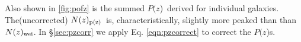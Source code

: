 \documentclass[preprint]{aastex}
\newcommand{\pofz}{$P(z$)}
\newcommand{\nwei}{N(z)_{\rm wei}}
\newcommand{\npz}{N(z)_{\rm p(z)}}
\begin{document}
Also shown in \ref{fig:pofz} is the summed \pofz\ derived for individual
galaxies.  The(uncorrected) $\npz$\ is, characteristically, slightly more peaked than
than $\nwei$.
In \S \ref{sec:pzcorr} we apply Eq. \ref{eqn:pzcorrect} to correct the \pofz s.
\end{document}
